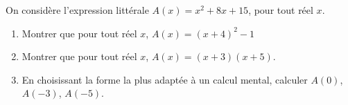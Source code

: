 
On considère l'expression littérale $A(x)=x^2+8x+15$, pour tout réel $x$.

\begin{enumerate}
\item Montrer que pour tout réel $x$, $A(x)=(x+4)^2-1$
\item Montrer que pour tout réel $x$, $A(x)=(x+3)(x+5)$.
\item En choisissant la forme la plus adaptée à un calcul mental, calculer $A(0)$, $A(-3)$, $A(-5)$.
\end{enumerate}


